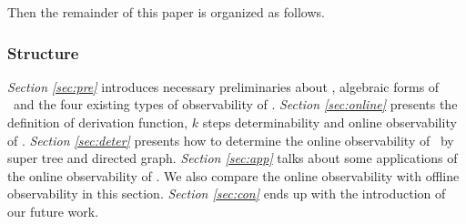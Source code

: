 Then the remainder of this paper is organized as follows.
\subsubsection*{Structure}
 {\em Section \ref{sec:pre}} introduces necessary preliminaries about \BCNs, algebraic forms of \BCNs\ and the four existing types of observability of  \BCNs. {\em Section \ref{sec:online}} presents the definition of derivation function, $k$ steps determinability and online observability of \BCNs. {\em Section \ref{sec:deter}} presents how to determine the online observability of \BCNs\ by super tree and directed graph. {\em Section \ref{sec:app}} talks about some applications of the online observability of \BCNs. We also compare the online observability with offline observability in this section. {\em Section \ref{sec:con}} ends up  with the introduction of our future work.


